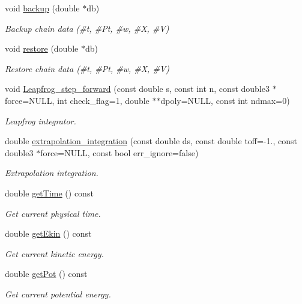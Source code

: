 \begin{DoxyCompactItemize}
void \hyperlink{classARC_1_1chain_a587009b6c6db0490c0f335aba732d77a}{backup} (double $\ast$db)
\begin{DoxyCompactList}\small\item\em Backup chain data (\#t, \#\+Pt, \#w, \#X, \#V) \end{DoxyCompactList}\item 
void \hyperlink{classARC_1_1chain_a2e7873b3a50ba9276d9a7595cb1d768d}{restore} (double $\ast$db)
\begin{DoxyCompactList}\small\item\em Restore chain data (\#t, \#\+Pt, \#w, \#X, \#V) \end{DoxyCompactList}\item 
void \hyperlink{classARC_1_1chain_a82b26731761231d86fd2e0b4529df6fa}{Leapfrog\+\_\+step\+\_\+forward} (const double s, const int n, const double3 $\ast$force=N\+U\+LL, int check\+\_\+flag=1, double $\ast$$\ast$dpoly=N\+U\+LL, const int ndmax=0)
\begin{DoxyCompactList}\small\item\em Leapfrog integrator. \end{DoxyCompactList}\item 
double \hyperlink{classARC_1_1chain_a0eb7768cb1b9099bbf66124d4c00164c}{extrapolation\+\_\+integration} (const double ds, const double toff=-\/1., const double3 $\ast$force=N\+U\+LL, const bool err\+\_\+ignore=false)
\begin{DoxyCompactList}\small\item\em Extrapolation integration. \end{DoxyCompactList}\item 
double \hyperlink{classARC_1_1chain_a48bde99d89b99df54844e1331d4814bb}{get\+Time} () const
\begin{DoxyCompactList}\small\item\em Get current physical time. \end{DoxyCompactList}\item 
double \hyperlink{classARC_1_1chain_ad7e8b3a20521f095a6935845f8a2ee53}{get\+Ekin} () const
\begin{DoxyCompactList}\small\item\em Get current kinetic energy. \end{DoxyCompactList}\item 
double \hyperlink{classARC_1_1chain_ae59c00c676af34f22c650076eb0aa83a}{get\+Pot} () const
\begin{DoxyCompactList}\small\item\em Get current potential energy. \end{DoxyCompactList}\item 
$$
\end{DoxyCompactItemize}

